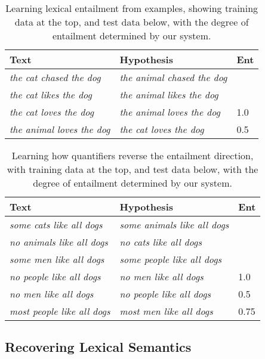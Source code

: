 \documentclass{svmult}
\begin{document}
\begin{table*}
\centering
\begin{tabular}{|l|l|l|}
\hline
Text & Hypothesis & Ent\\
\hline
\emph{the cat chased the dog} & \emph{the animal chased the dog} & \\
\emph{the cat likes the dog} & \emph{the animal likes the dog} & \\
\hline
\emph{the cat loves the dog} & \emph{the animal loves the dog} & 1.0\\
\emph{the animal loves the dog} & \emph{the cat loves the dog} & 0.5\\
\hline
\end{tabular}
\caption{Learning lexical entailment from examples, showing training
  data at the top, and test data below, with the degree of entailment
  determined by our system.}
\label{table:lexical}
\end{table*}

\begin{table*}
\centering
\begin{tabular}{|l|l|l|}
\hline
Text & Hypothesis & Ent\\
\hline
\emph{some cats like all dogs} & \emph{some animals like all dogs} & \\
\emph{no animals like all dogs} & \emph{no cats like all dogs} & \\
\emph{some men like all dogs} & \emph{some people like all dogs} & \\
\hline
\emph{no people like all dogs} & \emph{no men like all dogs} & 1.0\\
\emph{no men like all dogs} & \emph{no people like all dogs} & 0.5\\
\emph{most people like all dogs} & \emph{most men like all dogs} & 0.75\\
\hline
\end{tabular}
\caption{Learning how quantifiers reverse the entailment direction,
  with training data at the top, and test data below, with the degree
  of entailment determined by our system.}
\label{table:quantifiers}
\end{table*}

\begin{table}
\centering
{}
\caption{Learnt probabilities for the nouns in the example
  in Table \ref{table:quantifiers}}
\label{table:lexical}
\end{table}

\subsection{Recovering Lexical Semantics}
\label{sec:recovering}
\end{document}

